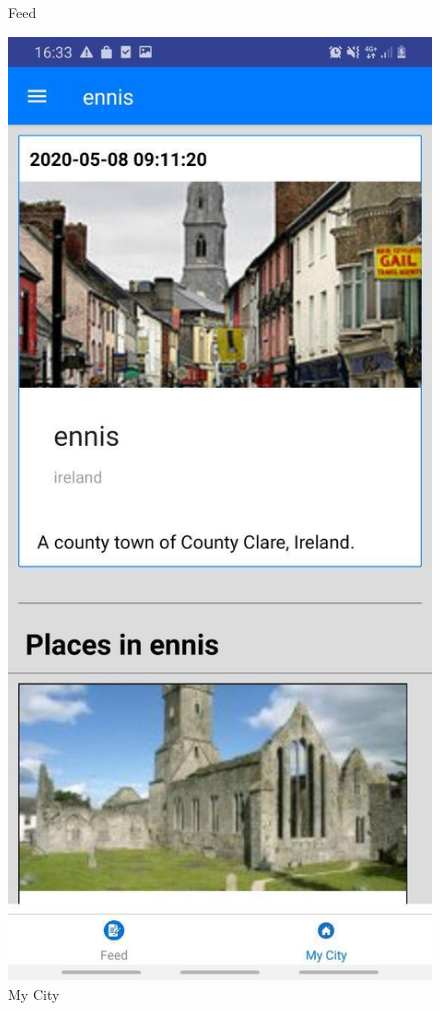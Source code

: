 \begin{figure}[h!]
\begin{minipage}[t]{0.48\textwidth}
\caption{Feed}
\label{fig:Feed}
\end{minipage}
\hspace*{\fill} %
\begin{minipage}[t]{0.48\textwidth}
\includegraphics[width=\linewidth,keepaspectratio=true]{img/mycity.jpg}
\caption{My City}
\label{fig:My City}
\end{minipage}
\end{figure}

